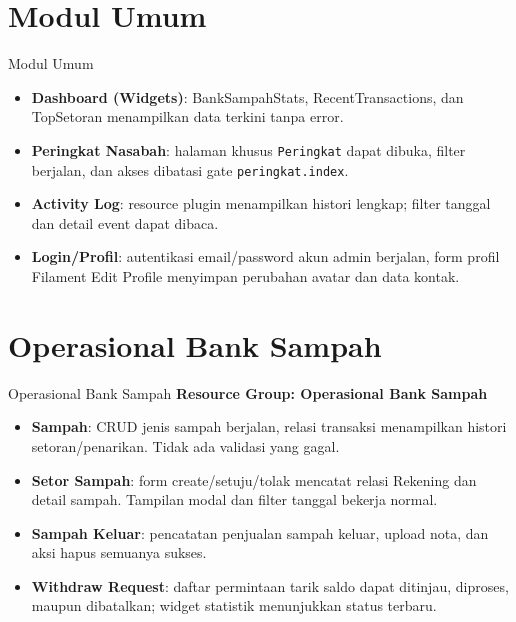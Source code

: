 \documentclass[aspectratio=169]{beamer}
\begin{document}
\section{Modul Umum}
\begin{frame}{Modul Umum}
  \begin{itemize}
    \item \textbf{Dashboard (Widgets)}: BankSampahStats, RecentTransactions, dan TopSetoran menampilkan data terkini tanpa error.
    \item \textbf{Peringkat Nasabah}: halaman khusus \texttt{Peringkat} dapat dibuka, filter berjalan, dan akses dibatasi gate \texttt{peringkat.index}.
    \item \textbf{Activity Log}: resource plugin menampilkan histori lengkap; filter tanggal dan detail event dapat dibaca.
    \item \textbf{Login/Profil}: autentikasi email/password akun admin berjalan, form profil Filament Edit Profile menyimpan perubahan avatar dan data kontak.
  \end{itemize}
\end{frame}

\section{Operasional Bank Sampah}
\begin{frame}{Operasional Bank Sampah}
  \textbf{Resource Group: Operasional Bank Sampah}
  \begin{itemize}
    \item \textbf{Sampah}: CRUD jenis sampah berjalan, relasi transaksi menampilkan histori setoran/penarikan. Tidak ada validasi yang gagal.
    \item \textbf{Setor Sampah}: form create/setuju/tolak mencatat relasi Rekening dan detail sampah. Tampilan modal dan filter tanggal bekerja normal.
    \item \textbf{Sampah Keluar}: pencatatan penjualan sampah keluar, upload nota, dan aksi hapus semuanya sukses.
    \item \textbf{Withdraw Request}: daftar permintaan tarik saldo dapat ditinjau, diproses, maupun dibatalkan; widget statistik menunjukkan status terbaru.
  \end{itemize}
\end{frame}
\end{document}
